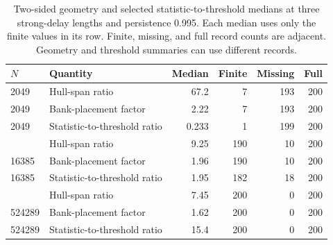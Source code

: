 \begin{table}[!htbp]
\centering\small\setlength{\tabcolsep}{4pt}
\caption{Two-sided geometry and selected statistic-to-threshold medians at three strong-delay lengths and persistence 0.995. Each median uses only the finite values in its row. Finite, missing, and full record counts are adjacent. Geometry and threshold summaries can use different records.}\label{tab:src16:geometry-examples}
\begin{tabular}{@{}llrrrr@{}}
\toprule
$N$ & Quantity & Median & Finite & Missing & Full \\\midrule
2049 & Hull-span ratio & 67.2 & 7 & 193 & 200 \\
2049 & Bank-placement factor & 2.22 & 7 & 193 & 200 \\
2049 & Statistic-to-threshold ratio & 0.233 & 1 & 199 & 200 \\
\addlinespace
16385 & Hull-span ratio & 9.25 & 190 & 10 & 200 \\
16385 & Bank-placement factor & 1.96 & 190 & 10 & 200 \\
16385 & Statistic-to-threshold ratio & 1.95 & 182 & 18 & 200 \\
\addlinespace
524289 & Hull-span ratio & 7.45 & 200 & 0 & 200 \\
524289 & Bank-placement factor & 1.62 & 200 & 0 & 200 \\
524289 & Statistic-to-threshold ratio & 15.4 & 200 & 0 & 200 \\
\bottomrule\end{tabular}
\end{table}
